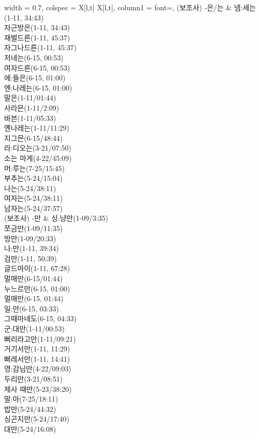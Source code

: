 \begin{longtblr}{
    width = 0.7\textwidth,
    colspec = {X[l,t] X[l,t]},
    column{1} = {font=\sffamily\bfseries},
  }
  (보조사) -은/는 & {넴:세는(1-11, 34:43) \\ 자근방은(1-11, 34:43) \\ 재벌드른(1-11, 45:37) \\ 자그나드른(1-11,   45:37) \\ 저네는(6-15, 00:53) \\ 여자드른(6-15, 00:53) \\ 에:들은(6-15, 01:00) \\ 엔:나레는(6-15,   01:00) \\ 말은(1-11/01:44) \\ 사라믄(1-11/2:09) \\ 바븐(1-11/05:33) \\ 옌나레는(1-11/11:29) \\ 지그믄(6-15/48:44) \\ 라:디오는(3-21/07:50) \\ 소는 마게(4-22/45:09) \\ 머:루는(7-25/15:45) \\ 부추는(5-24/15:04) \\ 나는(5-24/38:11) \\ 여자는(5-24/38:11) \\ 남자는(5-24/37:57)} \\
  (보조사) -만 & {싱:냥만(1-09/3:35) \\ 쪼금만(1-09/11:35) \\ 방만(1-09/20:33) \\ 나:만(1-11, 39:34) \\ 검만(1-11, 50:39) \\ 글드마이(1-11, 67:28) \\ 멀매만(6-15/01:44) \\ 누느르만(6-15, 01:00) \\ 멀매만(6-15, 01:44) \\ 일:만(6-15, 03:33) \\ 그때마네도(6-15, 04:33) \\ 군:대만(1-11/00:53) \\ 뻐리라고만(1-11/09:21) \\ 거기서만(1-11, 11:29) \\ 뻐레서만(1-11, 14:41) \\ 영:감님만(4-22/09:03) \\ 두리만(3-21/08:51) \\ 제사 때만(5-23/38:20) \\ 말:마(7-25/18:11) \\ 밥만(5-24/44:32) \\ 싱곤지만(5-24/17:40) \\ 대만(5-24/16:08)} \\

\end{longtblr}
